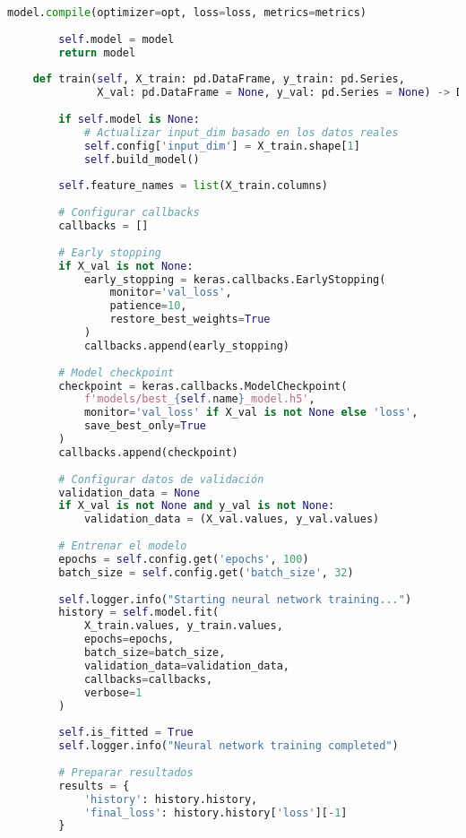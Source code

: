 \begin{lstlisting}[language=Python, caption=Implementación de red neuronal con TensorFlow]
        model.compile(optimizer=opt, loss=loss, metrics=metrics)
        
        self.model = model
        return model
    
    def train(self, X_train: pd.DataFrame, y_train: pd.Series, 
              X_val: pd.DataFrame = None, y_val: pd.Series = None) -> Dict[str, Any]:
        
        if self.model is None:
            # Actualizar input_dim basado en los datos reales
            self.config['input_dim'] = X_train.shape[1]
            self.build_model()
        
        self.feature_names = list(X_train.columns)
        
        # Configurar callbacks
        callbacks = []
        
        # Early stopping
        if X_val is not None:
            early_stopping = keras.callbacks.EarlyStopping(
                monitor='val_loss',
                patience=10,
                restore_best_weights=True
            )
            callbacks.append(early_stopping)
        
        # Model checkpoint
        checkpoint = keras.callbacks.ModelCheckpoint(
            f'models/best_{self.name}_model.h5',
            monitor='val_loss' if X_val is not None else 'loss',
            save_best_only=True
        )
        callbacks.append(checkpoint)
        
        # Configurar datos de validación
        validation_data = None
        if X_val is not None and y_val is not None:
            validation_data = (X_val.values, y_val.values)
        
        # Entrenar el modelo
        epochs = self.config.get('epochs', 100)
        batch_size = self.config.get('batch_size', 32)
        
        self.logger.info("Starting neural network training...")
        history = self.model.fit(
            X_train.values, y_train.values,
            epochs=epochs,
            batch_size=batch_size,
            validation_data=validation_data,
            callbacks=callbacks,
            verbose=1
        )
        
        self.is_fitted = True
        self.logger.info("Neural network training completed")
        
        # Preparar resultados
        results = {
            'history': history.history,
            'final_loss': history.history['loss'][-1]
        }
        

\end{lstlisting}
